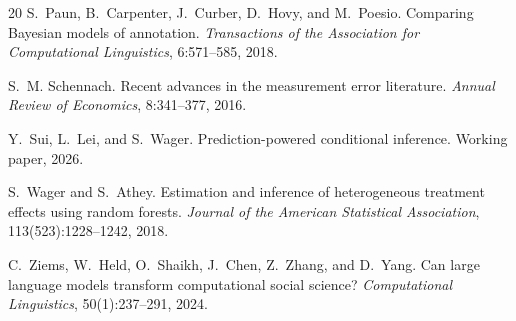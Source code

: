 \documentclass[11pt,a4paper]{article}
\begin{document}
\begin{thebibliography}{20}
S.~Paun, B.~Carpenter, J.~Curber, D.~Hovy, and M.~Poesio.
\newblock Comparing {B}ayesian models of annotation.
\newblock \emph{Transactions of the Association for Computational Linguistics}, 6:571--585, 2018.

S.~M. Schennach.
\newblock Recent advances in the measurement error literature.
\newblock \emph{Annual Review of Economics}, 8:341--377, 2016.

Y.~Sui, L.~Lei, and S.~Wager.
\newblock Prediction-powered conditional inference.
\newblock Working paper, 2026.

S.~Wager and S.~Athey.
\newblock Estimation and inference of heterogeneous treatment effects using random forests.
\newblock \emph{Journal of the American Statistical Association}, 113(523):1228--1242, 2018.

C.~Ziems, W.~Held, O.~Shaikh, J.~Chen, Z.~Zhang, and D.~Yang.
\newblock Can large language models transform computational social science?
\newblock \emph{Computational Linguistics}, 50(1):237--291, 2024.

\end{thebibliography}
\end{document}
